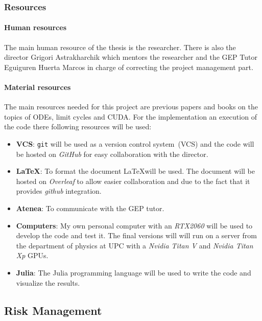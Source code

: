 \pagebreak
\subsubsection{Resources}

\paragraph{Human resources}

The main human resource of the thesis is the researcher.  There is also the
director Grigori Astrakharchik which mentors the researcher and the GEP Tutor
Eguiguren Huerta Marcos in charge of correcting the project management part.

\paragraph{Material resources}

The main resources needed for this project are previous papers and books on the
topics of ODEs, limit cycles and CUDA. For the implementation an execution of
the code there following resources will be used:

\begin{itemize}
    \item \textbf{VCS}: \texttt{git} will be used as a version control
        system~(VCS) and the code will be hosted on \emph{GitHub} for easy
        collaboration with the director.
    \item \textbf{\LaTeX}: To format the document \LaTeX will be used. The
        document will be hosted on \emph{Overleaf} to allow easier collaboration
        and due to the fact that it provides \emph{github} integration.
    \item \textbf{Atenea}: To communicate with the GEP tutor.
    \item \textbf{Computers}: My own personal computer with an \emph{RTX2060} will be
        used to develop the code and test it. The final versions will will run
        on a server from the department of physics at UPC with a \emph{Nvidia
        Titan V} and \emph{Nvidia Titan Xp} GPUs.
    \item \textbf{Julia}: The Julia programming language will be used to write
        the code and visualize the results.
\end{itemize}



\subsection{Risk Management}

